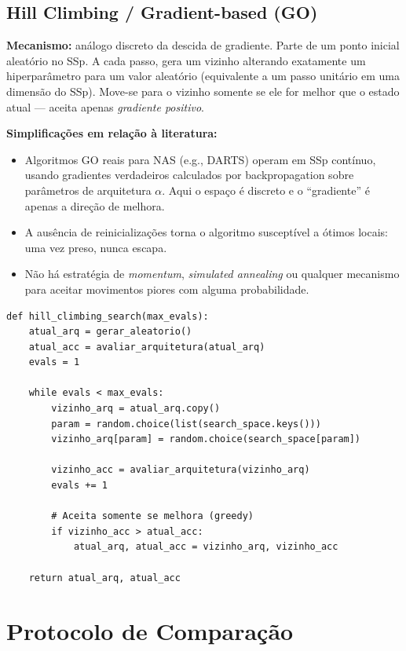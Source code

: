 \documentclass[a4paper,12pt]{article}
\begin{document}
\subsection{Hill Climbing / Gradient-based (GO)}

\textbf{Mecanismo:} análogo discreto da descida de gradiente. Parte de um ponto inicial aleatório no SSp. A cada passo, gera um vizinho alterando exatamente um hiperparâmetro para um valor aleatório (equivalente a um passo unitário em uma dimensão do SSp). Move-se para o vizinho somente se ele for melhor que o estado atual — aceita apenas \textit{gradiente positivo}.

\textbf{Simplificações em relação à literatura:}
\begin{itemize}[noitemsep]
    \item Algoritmos GO reais para NAS (e.g., DARTS) operam em SSp contínuo, usando gradientes verdadeiros calculados por backpropagation sobre parâmetros de arquitetura $\alpha$. Aqui o espaço é discreto e o ``gradiente'' é apenas a direção de melhora.
    \item A ausência de reinicializações torna o algoritmo susceptível a ótimos locais: uma vez preso, nunca escapa.
    \item Não há estratégia de \textit{momentum}, \textit{simulated annealing} ou qualquer mecanismo para aceitar movimentos piores com alguma probabilidade.
\end{itemize}

\begin{lstlisting}[style=python, caption={Hill Climbing discreto (análogo ao gradient-based).}]
def hill_climbing_search(max_evals):
    atual_arq = gerar_aleatorio()
    atual_acc = avaliar_arquitetura(atual_arq)
    evals = 1

    while evals < max_evals:
        vizinho_arq = atual_arq.copy()
        param = random.choice(list(search_space.keys()))
        vizinho_arq[param] = random.choice(search_space[param])

        vizinho_acc = avaliar_arquitetura(vizinho_arq)
        evals += 1

        # Aceita somente se melhora (greedy)
        if vizinho_acc > atual_acc:
            atual_arq, atual_acc = vizinho_arq, vizinho_acc

    return atual_arq, atual_acc
\end{lstlisting}

\section{Protocolo de Comparação}
\end{document}

